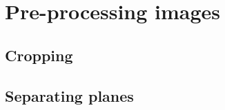 \section{Pre-processing images}
\label{sec:sectiona}

\subsection{Cropping}
\label{subsec:subasectionA}

\subsection{Separating planes}
\label{subsec:subbsectionA}